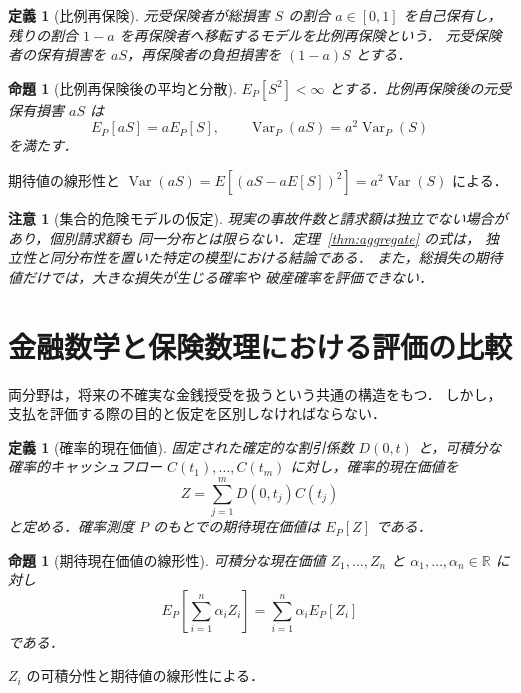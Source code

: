 \documentclass[a5paper,10pt,onecolumn]{jsarticle}
\makeatletter
\theoremstyle{mathnotetheorem}
\newtheorem{definition}[theorem]{定義}
\newtheorem{proposition}[theorem]{命題}
\newtheorem{remark}[theorem]{注意}
\renewcommand{\proofname}{証明}
\renewenvironment{proof}[1][\proofname]{%
  \par\pushQED{\qed}\normalfont\topsep4\p@\@plus2\p@\relax
  \trivlist\item[\hskip\labelsep\bfseries #1]\ignorespaces
}{\popQED\endtrivlist\@endpefalse}
\newcommand{\R}{\mathbb{R}}
\makeatother
\begin{document}
\begin{definition}[比例再保険]
元受保険者が総損害 $S$ の割合 $a\in[0,1]$ を自己保有し，
残りの割合 $1-a$ を再保険者へ移転するモデルを\emph{比例再保険}という．
元受保険者の保有損害を $aS$，再保険者の負担損害を $(1-a)S$ とする．
\end{definition}

\begin{proposition}[比例再保険後の平均と分散]
$E_P[S^2]<\infty$ とする．比例再保険後の元受保有損害 $aS$ は
\[
 E_P[aS]=aE_P[S],\qquad
 \operatorname{Var}_P(aS)=a^2\operatorname{Var}_P(S)
\]
を満たす．
\end{proposition}
\begin{proof}
期待値の線形性と
$\operatorname{Var}(aS)=E[(aS-aE[S])^2]=a^2\operatorname{Var}(S)$
による．\end{proof}

\begin{remark}[集合的危険モデルの仮定]
現実の事故件数と請求額は独立でない場合があり，個別請求額も
同一分布とは限らない．定理~\ref{thm:aggregate} の式は，
独立性と同分布性を置いた特定の模型における結論である．
また，総損失の期待値だけでは，大きな損失が生じる確率や
破産確率を評価できない．
\end{remark}

\section{金融数学と保険数理における評価の比較}

両分野は，将来の不確実な金銭授受を扱うという共通の構造をもつ．
しかし，支払を評価する際の目的と仮定を区別しなければならない．

\begin{definition}[確率的現在価値]
固定された確定的な割引係数 $D(0,t)$ と，可積分な確率的キャッシュフロー
$C(t_1),\ldots,C(t_m)$ に対し，確率的現在価値を
\[
 Z=\sum_{j=1}^m D(0,t_j)C(t_j)
\]
と定める．確率測度 $P$ のもとでの期待現在価値は
$E_P[Z]$ である．
\end{definition}

\begin{proposition}[期待現在価値の線形性]
可積分な現在価値 $Z_1,\ldots,Z_n$ と
$\alpha_1,\ldots,\alpha_n\in\R$ に対し
\[
 E_P\!\left[\sum_{i=1}^n\alpha_iZ_i\right]
 =\sum_{i=1}^n\alpha_iE_P[Z_i]
\]
である．
\end{proposition}
\begin{proof}
$Z_i$ の可積分性と期待値の線形性による．\end{proof}
\end{document}
